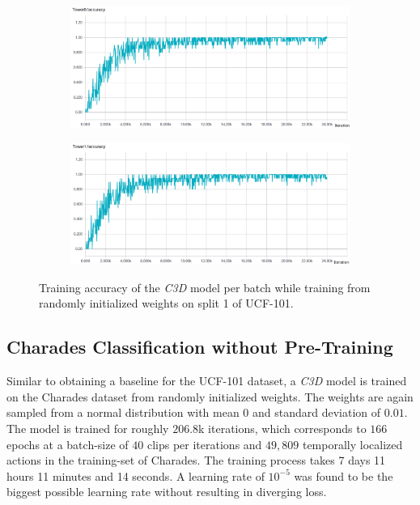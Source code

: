 \begin{figure}[H]
    \begin{subfigure}[c]{\textwidth}
    \centering
    \includegraphics[width=\textwidth]{img_evaluation/ucf101_scratch/tower0accuracy}
    \end{subfigure}
    \begin{subfigure}[c]{\textwidth}
    \includegraphics[width=\textwidth]{img_evaluation/ucf101_scratch/tower1accuracy}
    \end{subfigure}
    \caption{Training accuracy of the \textit{C3D} model per batch while training from randomly initialized weights on split 1 of UCF-101.}
    \label{fig:ucf101scratchaccuracy}
\end{figure}


\subsection{Charades Classification without Pre-Training}
Similar to obtaining a baseline for the UCF-101 dataset, a \textit{C3D} model is trained on the Charades dataset from randomly initialized weights.
The weights are again sampled from a normal distribution with mean $0$ and standard deviation of $0.01$.
The model is trained for roughly $206.8$k iterations, which corresponds to $166$ epochs at a batch-size of $40$ clips per iterations and $49,809$ temporally localized actions in the training-set of Charades.
The training process takes 7 days 11 hours 11 minutes and 14 seconds.
A learning rate of $10^{-5}$ was found to be the biggest possible learning rate without resulting in diverging loss.

